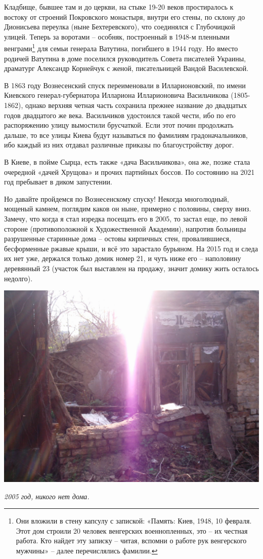 Кладбище, бывшее там и до церкви, на стыке 19-20 веков простиралось к востоку от строений Покровского монастыря, внутри его стены, по склону до Дионисьева переулка (ныне Бехтеревского), что соединялся с Глубочицкой улицей. Теперь за воротами – особняк, построенный в 1948-м пленными венграми\footnote{Они вложили в стену капсулу с запиской: «Память: Киев, 1948, 10 февраля. Этот дом строили 20 человек венгерских военнопленных, это – их честная работа. Кто найдет эту записку – читая, вспомни о работе рук венгерского мужчины» – далее перечислялись фамилии.} для семьи генерала Ватутина, погибшего в 1944 году. Но вместо родичей Ватутина в доме поселился руководитель Совета писателей Украины, драматург Александр Корнейчук с женой, писательницей Вандой Василевской.

В 1863 году Вознесенский спуск переименовали в Илларионовский, по имени Киевского генерал-губернатора Иллариона Илларионовича Васильчикова (1805-1862), однако верхняя четная часть сохранила прежнее название до двадцатых годов двадцатого же века. Васильчиков удостоился такой чести, ибо по его распоряжению улицу вымостили брусчаткой. Если этот почин продолжать дальше, то все улицы Киева будут называться по фамилиям градоначальников, ибо каждый из них отдавал различные приказы по благоустройству дорог.

В Киеве, в пойме Сырца, есть также «дача Васильчикова», она же, позже стала очередной «дачей Хрущова» и прочих партийных боссов. По состоянию на 2021 год пребывает в диком запустении.

Но давайте пройдемся по Вознесенскому спуску! Некогда многолюдный, мощеный камнем, поглядим каков он ныне, примерно с половины, сверху вниз. Замечу, что когда я стал изредка посещать его в 2005, то застал еще, по левой стороне (противоположной к Художественной Академии), напротив больницы разрушенные старинные дома – остовы кирпичных стен, провалившиеся, бесформенные ржавые крыши, и всё это зарастало бурьяном. На 2015 год и следа их нет уже, держался только домик номер 21, и чуть ниже его – наполовину деревянный 23 (участок был выставлен на продажу, значит домику жить осталось недолго).

\begin{center}
\includegraphics[width=0.86\linewidth]{chast-colebanie-osnov/gora-zamkovaya-valovaya/imag0013.jpg}

\textit{2005 год, никого нет дома.}
\end{center}

